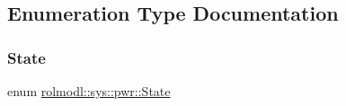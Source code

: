 \subsection{Enumeration Type Documentation}
\mbox{\label{namespacerolmodl_1_1sys_1_1pwr_ae84fe28ac28fdac077ff5363a4fc0dfb}} 
\subsubsection{\texorpdfstring{State}{State}}
{\footnotesize\ttfamily enum \mbox{\hyperlink{namespacerolmodl_1_1sys_1_1pwr_ae84fe28ac28fdac077ff5363a4fc0dfb}{rolmodl\+::sys\+::pwr\+::\+State}}\hspace{0.3cm}{\ttfamily [strong]}}

